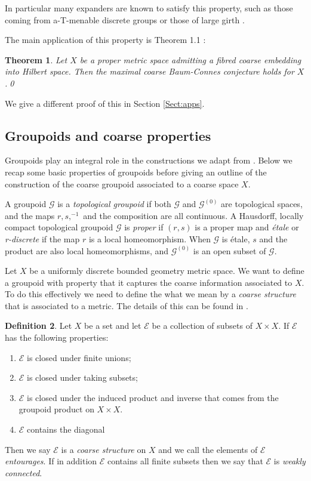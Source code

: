 \documentclass[preprint]{elsarticle}
\theoremstyle{plain}
\newtheorem{theorem}{Theorem}%
\theoremstyle{definition}%
\newtheorem{definition}[theorem]{Definition}%
\theoremstyle{remark}%
\newcommand{\G}{\mathcal{G}}
\begin{document}
In particular many expanders are known to satisfy this property, such as those coming from a-T-menable discrete groups or those of large girth \cite{FCEpaper,MR2568691}.

The main application of this property is Theorem 1.1 \cite{FCEpaper}:

\begin{theorem}\label{Thm:FCEMR}
Let $X$ be a proper metric space admitting a fibred coarse embedding into Hilbert space. Then the maximal coarse Baum-Connes conjecture holds for $X$.\qed
\end{theorem}

We give a different proof of this in Section \ref{Sect:apps}.

\subsection{Groupoids and coarse properties}\label{sect:coarsegroupoids}
Groupoids play an integral role in the constructions we adapt from \cite{MR1905840}. Below we recap some basic properties of groupoids before giving an outline of the construction of the coarse groupoid associated to a coarse space $X$.

A groupoid $\G$ is a \textit{topological groupoid} if both $\G$ and $\G^{(0)}$ are topological spaces, and the maps $r,s, ^{-1}$ and the composition are all continuous. A Hausdorff, locally compact topological groupoid $\G$ is \textit{proper} if $(r,s)$ is a proper map and \textit{\'etale} or \textit{r-discrete} if the map $r$ is a local homeomorphism. When $\G$ is \'etale, $s$ and the product are also local homeomorphisms, and $\G^{(0)}$ is an open subset of $\G$.

Let $X$ be a uniformly discrete bounded geometry metric space. We want to define a groupoid with property that it captures the coarse information associated to $X$. To do this effectively we need to define the what we mean by a \textit{coarse structure} that is associated to a metric. The details of this can be found in \cite{MR2007488}.

\begin{definition}
Let $X$ be a set and let $\mathcal{E}$ be a collection of subsets of $X \times X$. If $\mathcal{E}$ has the following properties:
\begin{enumerate}
\item $\mathcal{E}$ is closed under finite unions;
\item $\mathcal{E}$ is closed under taking subsets;
\item $\mathcal{E}$ is closed under the induced product and inverse that comes from the groupoid product on $X \times X$.
\item $\mathcal{E}$ contains the diagonal
\end{enumerate}
Then we say $\mathcal{E}$ is a \textit{coarse structure} on $X$ and we call the elements of $\mathcal{E}$ \textit{entourages}. If in addition $\mathcal{E}$ contains all finite subsets then we say that $\mathcal{E}$ is \textit{weakly connected}.
\end{definition}
\end{document}
